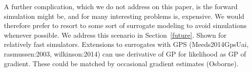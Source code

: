\documentclass[]{article}
\begin{document}
A further complication, which we do not address on this paper, is the forward simulation might be, and for many interesting problems is, expensive.  We would therefore prefer to resort to some sort of surrogate modeling \cite{Meeds2014GpsUai,wilkinson:2014, michael} to avoid simulations whenever possible. We address this scenario in Section~\ref{future}.  Shown for relatively fast simulators.  Extensions to surrogates with GPS (Meeds2014GpsUai, rasmussen:2003, wilkinson:2014) can use derivative of GP for likelihood as GP of gradient.  These could be matched by occasional gradient estimates (Osborne).

\clearpage


\end{document}
